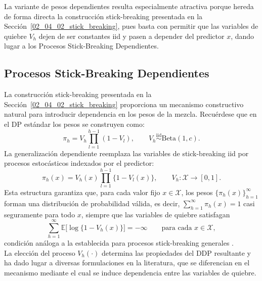 La variante de pesos dependientes resulta especialmente atractiva porque hereda de forma directa la construcción stick-breaking presentada en la Sección~\ref{02_04_02_stick_breaking}, pues basta con permitir que las variables de quiebre $V_h$ dejen de ser constantes iid y pasen a depender del predictor $x$, dando lugar a los Procesos Stick-Breaking Dependientes.

\subsection{Procesos Stick-Breaking Dependientes}
\label{02_06_02_sb_dependiente}
La construcción stick-breaking presentada en la Sección~\ref{02_04_02_stick_breaking} proporciona un mecanismo constructivo natural para introducir dependencia en los pesos de la mezcla. Recuérdese que en el DP estándar los pesos se construyen como:
\begin{equation}
    \pi_h = V_h \prod_{l=1}^{h-1}(1 - V_l),
    \qquad V_h \overset{\mathrm{iid}}{\sim} \mathrm{Beta}(1, c).
\end{equation}
La generalización dependiente reemplaza las variables de stick-breaking iid por procesos estocásticos indexados por el predictor:
\begin{equation}\label{eq:ddp_sb_general}
    \pi_h(x) = V_h(x) \prod_{l=1}^{h-1}\bigl\{1 - V_l(x)\bigr\},
    \qquad V_h : \mathcal{X} \to [0,1].
\end{equation}
Esta estructura garantiza que, para cada valor fijo $x \in \mathcal{X}$, los pesos $\{\pi_h(x)\}_{h=1}^{\infty}$ forman una distribución de probabilidad válida, es decir, $\sum_{h=1}^{\infty} \pi_h(x) = 1$ casi seguramente para todo $x$, siempre que las variables de quiebre satisfagan
\begin{equation}\label{eq:ddp_sb_condicion}
    \sum_{h=1}^{\infty} \mathbb{E}\bigl[\log\{1 - V_h(x)\}\bigr] = -\infty
    \qquad \text{para cada } x \in \mathcal{X},
\end{equation}
condición análoga a la establecida para procesos stick-breaking generales \citep{03_02_chung2009nonparametric}.\\

La elección del proceso $V_h(\cdot)$ determina las propiedades del DDP resultante y ha dado lugar a diversas formulaciones en la literatura, que se diferencian en el mecanismo mediante el cual se induce dependencia entre las variables de quiebre. \\

